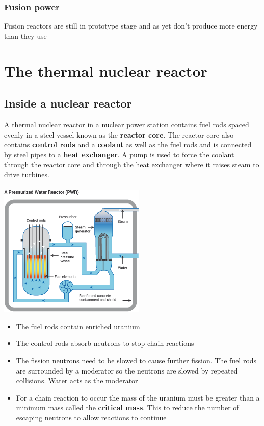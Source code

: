 \documentclass{article}[18pt]
\begin{document}
\subsubsection{Fusion power}
Fusion reactors are still in prototype stage and as yet don't produce more energy than they use
\section{The thermal nuclear reactor}
\subsection{Inside a nuclear reactor}
A thermal nuclear reactor in a nuclear power station contains fuel rods spaced evenly in a steel vessel known as the \textbf{reactor core}. The reactor core also contains \textbf{control rods} and a \textbf{coolant} as well as the fuel rods and is connected by steel pipes to a \textbf{heat exchanger}. A pump is used to force the coolant through the reactor core and through the heat exchanger where it raises steam to drive turbines.\\
\\
\includegraphics[width=7cm]{reactor.png}
\begin{itemize}
\item The fuel rods contain enriched uranium
\item The control rods absorb neutrons to stop chain reactions
\item The fission neutrons need to be slowed to cause further fission. The fuel rods are surrounded by a moderator so the neutrons are slowed by repeated collisions. Water acts as the moderator
\item For a chain reaction to occur the mass of the uranium must be greater than a minimum mass called the \textbf{critical mass}. This to reduce the number of escaping neutrons to allow reactions to continue
\end{itemize}
\end{document}
